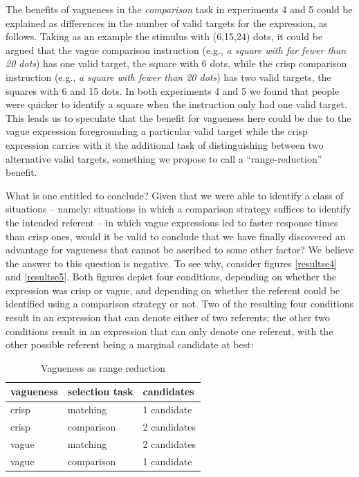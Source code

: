 \documentclass[doc,apacite]{apa6}
\begin{document}
The benefits of vagueness in the \emph{comparison} task in experiments 4 and 5 could be explained as differences in the number of valid targets for the expression, as follows. Taking as an example the stimulus with (6,15,24) dots, it could be argued that the vague comparison instruction (e.g., \emph{a square with far fewer than 20 dots}) has one valid target, the square with 6 dots, while the crisp comparison instruction (e.g., \emph{a square with fewer than 20 dots}) has two valid targets, the squares with 6 and 15 dots. In both experiments 4 and 5 we found that people were quicker to identify a square when the instruction only had one valid target. This leads us to speculate that the benefit for vagueness here could be due to the vague expression foregrounding a particular valid target while the crisp expression carries with it the additional task of distinguishing between two alternative valid targets, something we propose to call a ``range-reduction'' benefit.

What is one entitled to conclude? Given that we were able to identify a class of situations -- namely: situations in which a comparison strategy suffices to identify the intended referent -- in which vague expressions led to faster response times than crisp ones, would it be valid to conclude that we have finally discovered an advantage for vagueness that cannot be ascribed to some other factor? We believe the answer to this question is negative. To see why, consider figures \ref{resultse4} and \ref{resultse5}. Both figures depict four conditions, depending on whether the expression was crisp or vague, and depending on whether the referent could be identified using a comparison strategy or not. Two of the resulting four conditions result in an expression that can denote either of two referents; the other two conditions result in an expression that can only denote one referent, with the other possible referent being a marginal candidate at best:

\begin{table}[htbp]
\caption{Vagueness as range reduction}
\begin{center}
\begin{tabular}{lll}
\hline
vagueness & selection task & candidates\\
\hline
crisp & matching & 1 candidate\\
crisp & comparison & 2 candidates\\
vague & matching & 2 candidates\\
vague & comparison & 1 candidate\\
\hline
\end{tabular}
\end{center}
\label{default}
\end{table}
\end{document}
